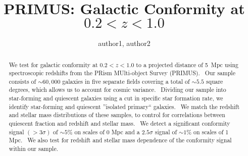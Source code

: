 \documentclass[apj,tighten,iop]{emulateapj2}
\begin{document}
\title{PRIMUS: Galactic Conformity at $0.2<z<1.0$}

\author{
author1,
author2
}


\begin{abstract}
We test for galactic conformity at $0.2<z<1.0$ to a projected distance of 5~Mpc using spectroscopic redshifts from the PRism MUlti-object Survey (PRIMUS).  Our sample consists of $\sim60,000$ galaxies in five separate fields covering a total of $\sim5.5$ square degrees, which allows us to account for cosmic variance.  Dividing our sample into star-forming and quiescent galaxies using a cut in specific star formation rate, we identify star-forming and quiescent ''isolated primary`` galaxies.  We match the redshift and stellar mass distributions of these samples, to control for correlations between quiescent fraction and redshift and stellar mass.  We detect a significant conformity signal $(>3\sigma)$ of $\sim5\%$ on scales of 0 Mpc and a $2.5\sigma$ signal of $\sim1\%$ on scales of 1 Mpc.  We also test for redshift and stellar mass dependence of the conformity signal within our sample.
\end{abstract}





%



%

%

%
\end{document}

